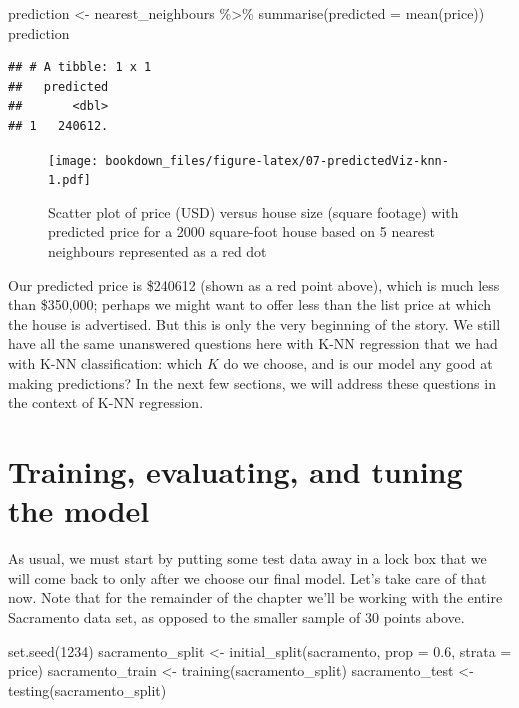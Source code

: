 \documentclass[
]{krantz}
\makeatletter
\newenvironment{Shaded}{\begin{snugshade}}{\end{snugshade}}
\newcommand{\AttributeTok}[1]{\textcolor[rgb]{0.61,0.61,0.61}{#1}}
\newcommand{\DecValTok}[1]{\textcolor[rgb]{0.06,0.06,0.06}{#1}}
\newcommand{\FloatTok}[1]{\textcolor[rgb]{0.06,0.06,0.06}{#1}}
\newcommand{\FunctionTok}[1]{\textcolor[rgb]{0,0,0}{#1}}
\newcommand{\NormalTok}[1]{#1}
\newcommand{\OtherTok}[1]{\textcolor[rgb]{0.37,0.37,0.37}{#1}}
\newcommand{\SpecialCharTok}[1]{\textcolor[rgb]{0,0,0}{#1}}
\newenvironment{kframe}{%
\medskip{}
\setlength{\fboxsep}{.8em}
 \def\at@end@of@kframe{}%
 \ifinner\ifhmode%
  \def\at@end@of@kframe{\end{minipage}}%
  \begin{minipage}{\columnwidth}%
 \fi\fi%
 \def\FrameCommand##1{\hskip\@totalleftmargin \hskip-\fboxsep
 \colorbox{shadecolor}{##1}\hskip-\fboxsep
     \hskip-\linewidth \hskip-\@totalleftmargin \hskip\columnwidth}%
 \MakeFramed {\advance\hsize-\width
   \@totalleftmargin\z@ \linewidth\hsize
   \@setminipage}}%
 {\par\unskip\endMakeFramed%
 \at@end@of@kframe}
\renewenvironment{Shaded}{\begin{kframe}}{\end{kframe}}
\makeatother
\begin{document}
\begin{Shaded}
\begin{Highlighting}[]
\NormalTok{prediction }\OtherTok{\textless{}{-}}\NormalTok{ nearest\_neighbours }\SpecialCharTok{\%\textgreater{}\%}
  \FunctionTok{summarise}\NormalTok{(}\AttributeTok{predicted =} \FunctionTok{mean}\NormalTok{(price))}
\NormalTok{prediction}
\end{Highlighting}
\end{Shaded}

\begin{verbatim}
## # A tibble: 1 x 1
##   predicted
##       <dbl>
## 1   240612.
\end{verbatim}

\begin{figure}
\centering
\texttt{[image: bookdown\_files/figure-latex/07-predictedViz-knn-1.pdf]}
\caption{\label{fig:07-predictedViz-knn}Scatter plot of price (USD) versus house size (square footage) with predicted price for a 2000 square-foot house based on 5 nearest neighbours represented as a red dot}
\end{figure}

Our predicted price is \$240612
(shown as a red point above), which is much less than \$350,000; perhaps we
might want to offer less than the list price at which the house is advertised.
But this is only the very beginning of the story. We still have all the same
unanswered questions here with K-NN regression that we had with K-NN
classification: which \(K\) do we choose, and is our model any good at making
predictions? In the next few sections, we will address these questions in the
context of K-NN regression.

\hypertarget{training-evaluating-and-tuning-the-model}{%
\section{Training, evaluating, and tuning the model}\label{training-evaluating-and-tuning-the-model}}

As usual, we must start by putting some test data away in a lock box that we
will come back to only after we choose our final model. Let's take care of that
now. Note that for the remainder of the chapter we'll be working with the
entire Sacramento data set, as opposed to the smaller sample of 30 points above.

\begin{Shaded}
\begin{Highlighting}[]
\FunctionTok{set.seed}\NormalTok{(}\DecValTok{1234}\NormalTok{)}
\NormalTok{sacramento\_split }\OtherTok{\textless{}{-}} \FunctionTok{initial\_split}\NormalTok{(sacramento, }\AttributeTok{prop =} \FloatTok{0.6}\NormalTok{, }\AttributeTok{strata =}\NormalTok{ price)}
\NormalTok{sacramento\_train }\OtherTok{\textless{}{-}} \FunctionTok{training}\NormalTok{(sacramento\_split)}
\NormalTok{sacramento\_test }\OtherTok{\textless{}{-}} \FunctionTok{testing}\NormalTok{(sacramento\_split)}
\end{Highlighting}
\end{Shaded}
\end{document}

